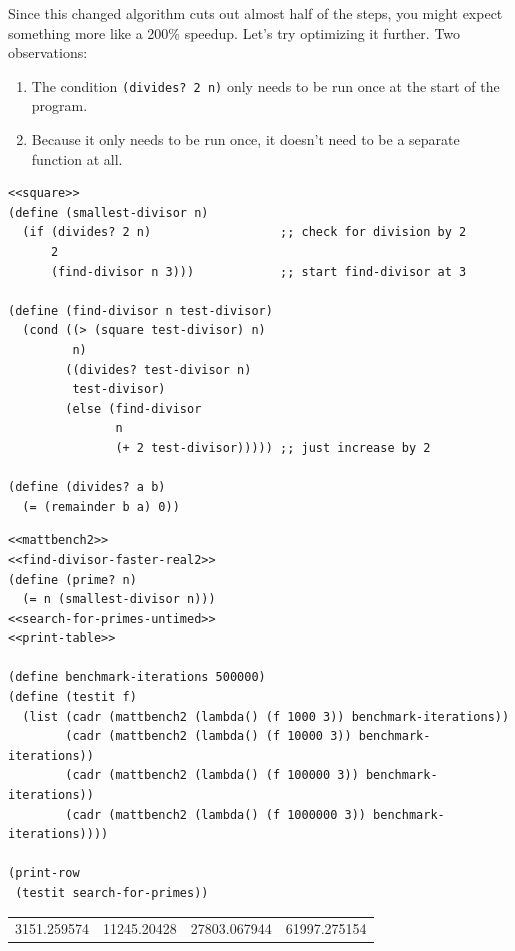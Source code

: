 \documentclass[final,fleqn,titlepage,twoside]{article}
\begin{document}
Since this changed algorithm cuts out almost half of the steps, you might expect
something more like a 200\% speedup. Let's try optimizing it further. Two observations:

\begin{enumerate}
\item The condition \texttt{(divides? 2 n)} only needs to be run once at the
start of the program.
\item Because it only needs to be run once, it doesn't need to be a separate
function at all.
\end{enumerate}

\begin{verbatim}
<<square>>
(define (smallest-divisor n)
  (if (divides? 2 n)                  ;; check for division by 2
      2
      (find-divisor n 3)))            ;; start find-divisor at 3

(define (find-divisor n test-divisor)
  (cond ((> (square test-divisor) n) 
         n)
        ((divides? test-divisor n) 
         test-divisor)
        (else (find-divisor 
               n 
               (+ 2 test-divisor))))) ;; just increase by 2

(define (divides? a b)
  (= (remainder b a) 0))
\end{verbatim}
\begin{verbatim}
<<mattbench2>>
<<find-divisor-faster-real2>>
(define (prime? n)
  (= n (smallest-divisor n)))
<<search-for-primes-untimed>>
<<print-table>>

(define benchmark-iterations 500000)
(define (testit f)
  (list (cadr (mattbench2 (lambda() (f 1000 3)) benchmark-iterations))
        (cadr (mattbench2 (lambda() (f 10000 3)) benchmark-iterations))
        (cadr (mattbench2 (lambda() (f 100000 3)) benchmark-iterations))
        (cadr (mattbench2 (lambda() (f 1000000 3)) benchmark-iterations))))

(print-row
 (testit search-for-primes))
\end{verbatim}


\begin{table}[htbp]
\label{1-22-smdff2}
\centering
\begin{tabular}{rrrr}
3151.259574 & 11245.20428 & 27803.067944 & 61997.275154\\[0pt]
\end{tabular}
\end{table}
\end{document}

